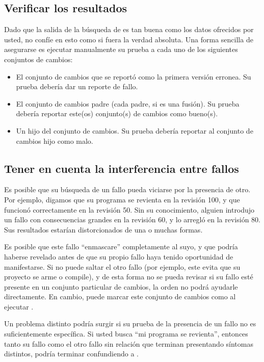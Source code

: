 \subsection{Verificar los resultados}

Dado que la salida de la búsqueda de  es tan buena como
los datos ofrecidos por usted, no confíe en esto como si fuera la
verdad absoluta. Una forma sencilla de asegurarse es ejecutar
manualmente su prueba a cada uno de los siguientes conjuntos de
cambios:
\begin{itemize}
\item El conjunto de cambios que se reportó como la primera versión
  erronea. Su prueba debería dar un reporte de fallo.
\item El conjunto de cambios padre (cada padre, si es una fusión).
  Su prueba debería reportar este(os) conjunto(s) de cambios como
  bueno(s).
\item Un hijo del conjunto de cambios. Su prueba debería reportar al
  conjunto de cambios hijo como malo.
\end{itemize}

\subsection{Tener en cuenta la interferencia entre fallos}

Es posible que su búsqueda de un fallo pueda viciarse por la presencia
de otro. Por ejemplo, digamos que su programa se revienta en la
revisión 100, y que funcionó correctamente en la revisión 50.  Sin su
conocimiento, alguien introdujo un fallo con consecuencias grandes en
la revisión 60, y lo arregló en la revisión 80. Sus resultados
estarían distorcionados de una o muchas formas.

Es posible que este fallo ``enmascare'' completamente al suyo, y que
podría haberse revelado antes de que su propio fallo haya tenido
oportunidad de manifestarse. Si no puede saltar el otro fallo (por
ejemplo, este evita que su proyecto se arme o compile), y de esta
forma no se pueda revisar si su fallo esté presente en un conjunto
particular de cambios, la orden  no podrá ayudarle
directamente. En cambio, puede marcar este conjunto de cambios como
al ejecutar .

Un problema distinto podría surgir si su prueba de la presencia de un
fallo no es suficientemente específica. Si usted busca ``mi programa
se revienta'', entonces tanto su fallo como el otro fallo sin relación
que terminan presentando síntomas distintos, podría terminar
confundiendo a .

